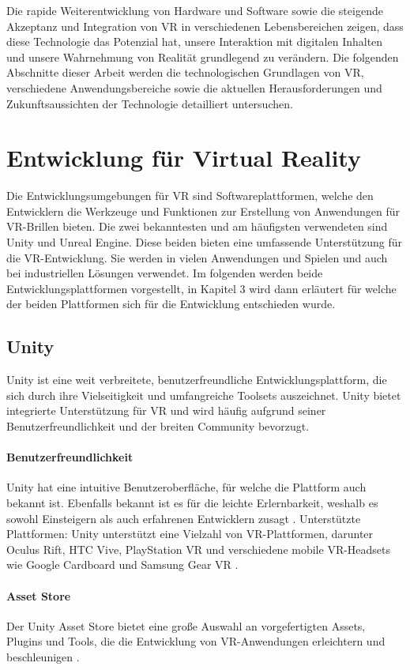 \noindent
Die rapide Weiterentwicklung von Hardware und Software sowie die steigende Akzeptanz und Integration von VR in verschiedenen Lebensbereichen zeigen, dass diese Technologie das Potenzial hat, unsere Interaktion mit digitalen Inhalten und unsere Wahrnehmung von Realität grundlegend zu verändern. Die folgenden Abschnitte dieser Arbeit werden die technologischen Grundlagen von VR, verschiedene Anwendungsbereiche sowie die aktuellen Herausforderungen und Zukunftsaussichten der Technologie detailliert untersuchen.


\section{Entwicklung für Virtual Reality}
Die Entwicklungsumgebungen für VR sind Softwareplattformen, welche den Entwicklern die Werkzeuge und Funktionen zur Erstellung von Anwendungen für VR-Brillen bieten. Die zwei bekanntesten und am häufigsten verwendeten sind Unity und Unreal Engine. Diese beiden bieten eine umfassende Unterstützung für die VR-Entwicklung. Sie werden in vielen Anwendungen und Spielen und auch bei industriellen Lösungen verwendet. Im folgenden werden beide Entwicklungsplattformen vorgestellt, in Kapitel 3 wird dann erläutert für welche der beiden Plattformen sich für die Entwicklung entschieden wurde.
\subsection{Unity}
Unity ist eine weit verbreitete, benutzerfreundliche Entwicklungsplattform, die sich durch ihre Vielseitigkeit und umfangreiche Toolsets auszeichnet. Unity bietet integrierte Unterstützung für VR und wird häufig aufgrund seiner Benutzerfreundlichkeit und der breiten Community bevorzugt.
\paragraph{Benutzerfreundlichkeit}
Unity hat eine intuitive Benutzeroberfläche, für welche die Plattform auch bekannt ist. Ebenfalls bekannt ist es für die leichte Erlernbarkeit, weshalb es sowohl Einsteigern als auch erfahrenen Entwicklern zusagt \cite{unity2021}.
Unterstützte Plattformen: Unity unterstützt eine Vielzahl von VR-Plattformen, darunter Oculus Rift, HTC Vive, PlayStation VR und verschiedene mobile VR-Headsets wie Google Cardboard und Samsung Gear VR \cite{unity2021}.
\paragraph{Asset Store}
Der Unity Asset Store bietet eine große Auswahl an vorgefertigten Assets, Plugins und Tools, die die Entwicklung von VR-Anwendungen erleichtern und beschleunigen \cite{unityAssetStore2021}.

